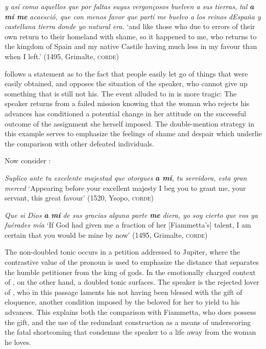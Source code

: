\documentclass[output=paper]{LSP/langsci}
\begin{document}
\newpage 
\ex \label{04-me-ex:15b}
\textit{y así como aquellos que por faltas suyas vergonçosos buelven a sus tierras,} \textit{tal} \textbf{\textit{a mí me}} \textit{acaesció, que con menos favor que partí me buelvo a los reinos} \textit{dEspaña y castellana tierra donde yo natural era.}
\glt ‘and like those who due to errors of their own return to their homeland with shame, so it happened to me, who returns to the kingdom of Spain and my native Castile having much less in my favour than when I left.’ (1495, Grimalte, \textsc{corde}) 
\z
\z

 follows a statement as to the fact that people easily let go of things that were easily obtained, and opposes the situation of the speaker, who cannot give up something that is still not his. The event alluded to in  is more tragic: The speaker returns from a failed mission knowing that the woman who rejects his advances has conditioned a potential change in her attitude on the successful outcome of the assignment she herself imposed. The double-mention strategy in this example serves to emphasize the feelings of shame and despair which underlie the comparison with other defeated individuals.

 Now consider :

\ea\label{04-me-ex:16}
\ea \label{04-me-ex:16a}
\textit{Suplico ante tu excelente majestad que otorgues} \textbf{\textit{a mí}}\textit{, tu servidora, esta gran} \textit{merced} 
\glt ‘Appearing before your excellent majesty I beg you to grant me, your servant, this great favour’ (1520, Ysopo, \textsc{corde)} 

\ex%
\label{04-me-ex:16b}
\textit{Que si Dios} \textbf{\textit{a mí}} \textit{de sus gracias alguna parte} \textbf{\textit{me}} \textit{diera, yo soy cierto que vos} \textit{ya fuérades mía} 
\glt ‘If God had given me a fraction of her [Fiammetta’s] talent, I am certain that you would be mine by now’ (1495, Grimalte, \textsc{corde}) 
\z
\z

The non-doubled tonic occurs in a petition addressed to Jupiter, where the contrastive value of the pronoun is used to emphasize the distance that separates the humble petitioner from the king of gods. In the emotionally charged context of , on the other hand, a doubled tonic surfaces. The speaker is the rejected lover of , who in this passage laments his not having been blessed with the gift of eloquence, another condition imposed by the beloved for her to yield to his advances. This explains both the comparison with Fiammetta, who does possess the gift, and the use of the redundant construction as a means of underscoring the fatal shortcoming that condemns the speaker to a life away from the woman he loves.
\end{document}
